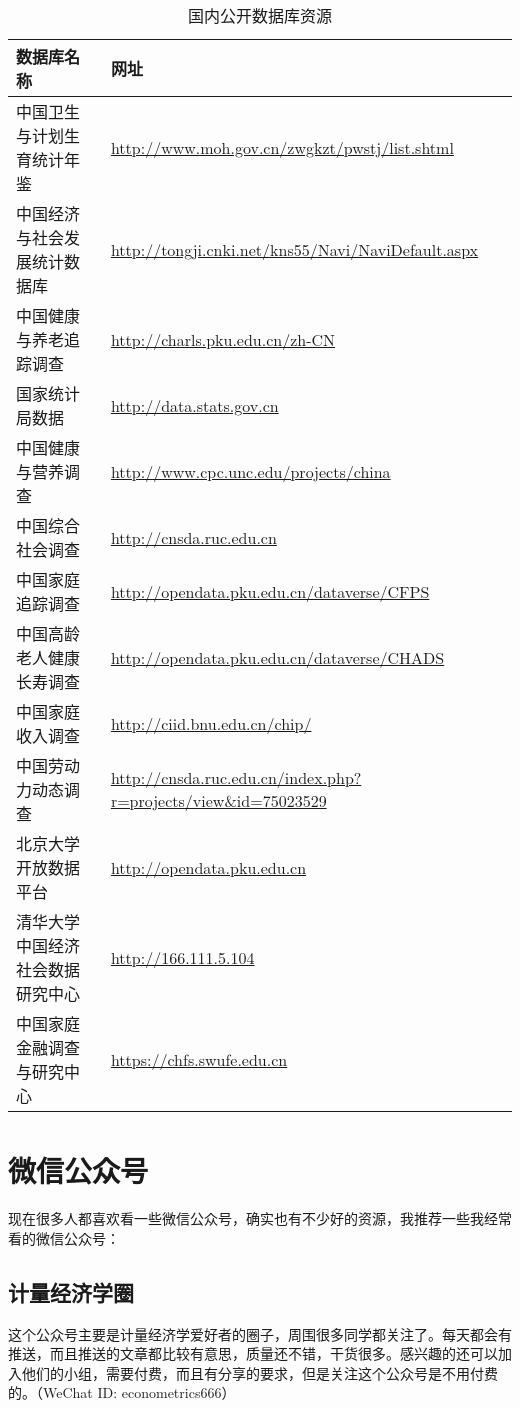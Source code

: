 \documentclass[11pt, a4paper]{article}
\begin{document}
\begin{table}[H]
\caption{国内公开数据库资源}
\centering
\begin{adjustbox}{max width=\textwidth}
\begin{threeparttable}
\begin{tabular}{lp{9cm}}
	\toprule
	数据库名称 & 网址\\
	\midrule
	中国卫生与计划生育统计年鉴 & \url{http://www.moh.gov.cn/zwgkzt/pwstj/list.shtml}\\
	中国经济与社会发展统计数据库 & \url{http://tongji.cnki.net/kns55/Navi/NaviDefault.aspx}\\
	中国健康与养老追踪调查 & \url{http://charls.pku.edu.cn/zh-CN}\\
	国家统计局数据 & \url{http://data.stats.gov.cn}\\
	中国健康与营养调查 & \url{http://www.cpc.unc.edu/projects/china}\\
	中国综合社会调查 & \url{http://cnsda.ruc.edu.cn}\\
	中国家庭追踪调查 & \url{http://opendata.pku.edu.cn/dataverse/CFPS}\\
	中国高龄老人健康长寿调查 & \url{http://opendata.pku.edu.cn/dataverse/CHADS}\\
	中国家庭收入调查 & \url{http://ciid.bnu.edu.cn/chip/}\\
	中国劳动力动态调查 & \url{http://cnsda.ruc.edu.cn/index.php?r=projects/view&id=75023529}\\
	北京大学开放数据平台 & \url{http://opendata.pku.edu.cn}\\
	清华大学中国经济社会数据研究中心 & \url{http://166.111.5.104}\\
	中国家庭金融调查与研究中心 & \url{https://chfs.swufe.edu.cn}	\\
	\bottomrule
\end{tabular}
\end{threeparttable}
\end{adjustbox}
\end{table}



\section{微信公众号}
现在很多人都喜欢看一些微信公众号，确实也有不少好的资源，我推荐一些我经常看的微信公众号：
\subsection{计量经济学圈}
这个公众号主要是计量经济学爱好者的圈子，周围很多同学都关注了。每天都会有推送，而且推送的文章都比较有意思，质量还不错，干货很多。感兴趣的还可以加入他们的小组，需要付费，而且有分享的要求，但是关注这个公众号是不用付费的。（WeChat ID: econometrics666）
\end{document}
